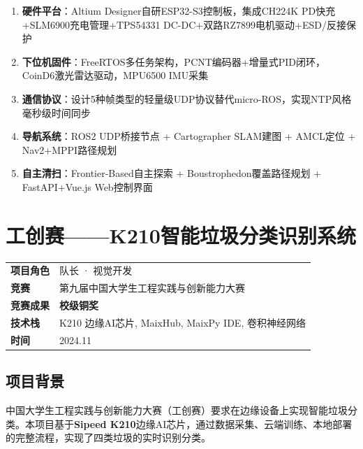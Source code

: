 \documentclass[12pt,a4paper]{ctexart}
\begin{document}
\begin{iterbox}[版本迭代]
\begin{enumerate}[label=\textbf{V\arabic*}:, leftmargin=3em]
    \item \textbf{硬件平台}：Altium Designer自研ESP32-S3控制板，集成CH224K PD快充+SLM6900充电管理+TPS54331 DC-DC+双路RZ7899电机驱动+ESD/反接保护
    \item \textbf{下位机固件}：FreeRTOS多任务架构，PCNT编码器+增量式PID闭环，CoinD6激光雷达驱动，MPU6500 IMU采集
    \item \textbf{通信协议}：设计5种帧类型的轻量级UDP协议替代micro-ROS，实现NTP风格毫秒级时间同步
    \item \textbf{导航系统}：ROS2 UDP桥接节点 + Cartographer SLAM建图 + AMCL定位 + Nav2+MPPI路径规划
    \item \textbf{自主清扫}：Frontier-Based自主探索 + Boustrophedon覆盖路径规划 + FastAPI+Vue.js Web控制界面
\end{enumerate}
\end{iterbox}

\newpage
\section{工创赛——K210智能垃圾分类识别系统}

\begin{infobox}[项目概况]
\begin{tabular}{ll}
\textbf{项目角色} & 队长 · 视觉开发 \\
\textbf{竞赛}     & 第九届中国大学生工程实践与创新能力大赛 \\
\textbf{竞赛成果} & \textbf{校级铜奖} \\
\textbf{技术栈}   & K210 边缘AI芯片, MaixHub, MaixPy IDE, 卷积神经网络 \\
\textbf{时间}     & 2024.11
\end{tabular}
\end{infobox}

\subsection{项目背景}

中国大学生工程实践与创新能力大赛（工创赛）要求在边缘设备上实现智能垃圾分类。本项目基于\textbf{Sipeed K210}边缘AI芯片，通过数据采集、云端训练、本地部署的完整流程，实现了四类垃圾的实时识别分类。
\end{document}
